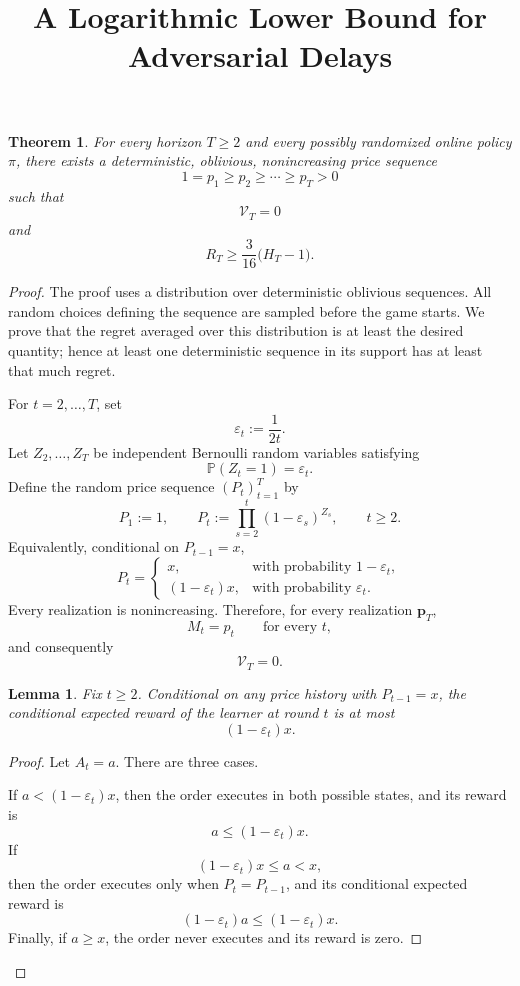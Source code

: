 \documentclass[11pt]{article}
\title{A Logarithmic Lower Bound for Adversarial Delays}
\author{}
\date{}
\newtheorem{theorem}{Theorem}
\newtheorem{lemma}{Lemma}
\theoremstyle{remark}
\renewcommand{\Pr}{\mathbb{P}}
\newcommand{\bp}{\boldsymbol{p}}
\newcommand{\cV}{\mathcal{V}}
\begin{document}
\maketitle

\begin{theorem}
\label{thm:log-lower-bound}
For every horizon $T\ge2$ and every possibly randomized online policy
$\pi$, there exists a deterministic, oblivious, nonincreasing price
sequence
\[
1=p_1\ge p_2\ge\cdots\ge p_T>0
\]
such that
\[
\cV_T=0
\]
and
\[
R_T
\ge
\frac{3}{16}\bigl(H_T-1\bigr).
\]
\end{theorem}

\begin{proof}

The proof uses a distribution over deterministic oblivious sequences.
All random choices defining the sequence are sampled before the game
starts.  We prove that the regret averaged over this distribution is at
least the desired quantity; hence at least one deterministic sequence in
its support has at least that much regret.

For $t=2,\ldots,T$, set
\[
\varepsilon_t:=\frac{1}{2t}.
\]
Let $Z_2,\ldots,Z_T$ be independent Bernoulli random variables satisfying
\[
\Pr(Z_t=1)=\varepsilon_t.
\]
Define the random price sequence $(P_t)_{t=1}^T$ by
\[
P_1:=1,
\qquad
P_t:=\prod_{s=2}^t(1-\varepsilon_s)^{Z_s},
\qquad t\ge2.
\]
Equivalently, conditional on $P_{t-1}=x$,
\[
P_t=
\begin{cases}
 x, & \text{with probability }1-\varepsilon_t,\\[1mm]
 (1-\varepsilon_t)x, & \text{with probability }\varepsilon_t.
\end{cases}
\tag{1}
\label{eq:transition}
\]
Every realization is nonincreasing.  Therefore, for every realization
$\bp_T$,
\[
M_t=p_t
\qquad\text{for every }t,
\]
and consequently
\[
\cV_T=0.
\tag{2}
\label{eq:variation-zero}
\]

\begin{lemma}
\label{lem:one-round}
Fix $t\ge2$.  Conditional on any price history with $P_{t-1}=x$, the
conditional expected reward of the learner at round $t$ is at most
\[
(1-\varepsilon_t)x.
\]
\end{lemma}

\begin{proof}
Let $A_t=a$.
There are three cases.

If $a<(1-\varepsilon_t)x$, then the order executes in both possible
states, and its reward is
\[
a\le(1-\varepsilon_t)x.
\]
If
\[
(1-\varepsilon_t)x\le a<x,
\]
then the order executes only when $P_t = P_{t-1}$, and its conditional
expected reward is
\[
(1-\varepsilon_t)a
\le
(1-\varepsilon_t)x.
\]
Finally, if $a\ge x$, the order never executes and its reward is zero.
\end{proof}


\end{proof}
\end{document}
